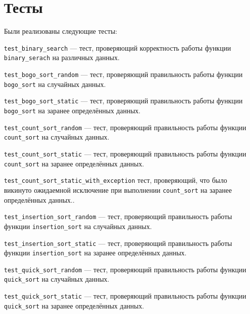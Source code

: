 \section*{Тесты}

Были реализованы следующие тесты:

\verb|test_binary_search| --- тест, проверяющий корректность работы функции \verb|binary_serach| на различных данных.

\verb|test_bogo_sort_random| --- тест, проверяющий правильность работы функции \verb|bogo_sort| на случайных данных.

\verb|test_bogo_sort_static| --- тест, проверяющий правильность работы функции \verb|bogo_sort| на заранее определённых данных.

\verb|test_count_sort_random| --- тест, проверяющий правильность работы функции \verb|count_sort| на случайных данных.

\verb|test_count_sort_static| --- тест, проверяющий правильность работы функции \verb|count_sort| на заранее определённых данных.

\verb|test_count_sort_static_with_exception| тест, проверяющий, что было викинуто ожидаемной исключение при выполнении \verb|count_sort| на заранее определённых данных..

\verb|test_insertion_sort_random| --- тест, проверяющий правильность работы функции \verb|insertion_sort| на случайных данных.

\verb|test_insertion_sort_static| --- тест, проверяющий правильность работы функции \verb|insertion_sort| на заранее определённых данных.

\verb|test_quick_sort_random| --- тест, проверяющий правильность работы функции \verb|quick_sort| на случайных данных.

\verb|test_quick_sort_static| --- тест, проверяющий правильность работы функции \verb|quick_sort| на заранее определённых данных.